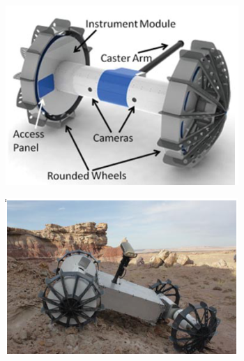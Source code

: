 \documentclass[12pt]{article}
\begin{document}
\begin{figure}
  \vspace{-0.2in}
  \begin{subfigure}{.26\textwidth}
    \centering
    \includegraphics[width=.75\linewidth]{axel_prototype}
    \caption{}
    \label{fig:axel}
  \end{subfigure}%
  \begin{subfigure}{.23\textwidth}
    \centering
    \includegraphics[width=.95\linewidth]{duaxel_prototype}
    \caption{}
    \label{fig:duaxel}
  \end{subfigure}
  \begin{subfigure}{.245\textwidth}
    \centering

\end{subfigure}
\end{figure}
\end{document}
